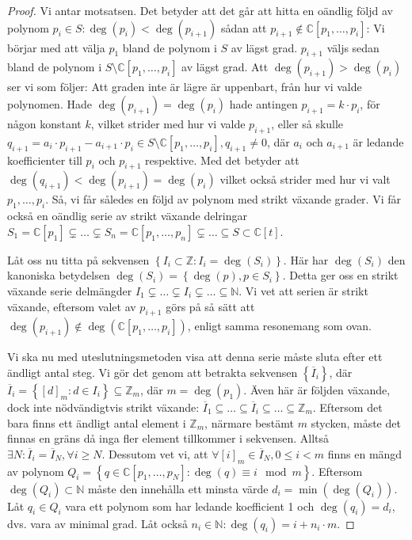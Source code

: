 \begin{proof}
Vi antar motsatsen. Det betyder att det går att hitta en oändlig följd av polynom $p_i\in S:\deg(p_i)<\deg(p_{i+1})$ sådan att $p_{i+1} \notin \mathbb{C}[p_1,\ldots,p_i]$: Vi börjar med att välja $p_1$ bland de polynom i $S$ av lägst grad. $p_{i+1}$ väljs sedan bland de polynom i $S \setminus \mathbb{C}[p_1,\ldots,p_i]$ av lägst grad. Att $\deg(p_{i+1})>\deg(p_i)$ ser vi som följer: Att graden inte är lägre är uppenbart, från hur vi valde polynomen. Hade $\deg(p_{i+1})=\deg(p_i)$ hade antingen $p_{i+1}=k\cdot p_i$, för någon konstant $k$, vilket strider med hur vi valde $p_{i+1}$, eller så skulle $q_{i+1}=a_i\cdot p_{i+1}-a_{i+1}\cdot p_i \in S\setminus\mathbb{C}[p_1,\ldots,p_i], q_{i+1} \neq 0$, där $a_i$ och $a_{i+1}$ är ledande koefficienter till $p_i$ och $p_{i+1}$ respektive. Med det betyder att $\deg(q_{i+1})<\deg(p_{i+1})=\deg(p_i)$ vilket också strider med hur vi valt $p_1,\ldots,p_i$. Så, vi får således en följd av polynom med strikt växande grader. Vi får också en oändlig serie av strikt växande delringar $S_1=\mathbb{C}[p_1] \subsetneq \ldots \subsetneq S_n=\mathbb{C}[p_1,\ldots,p_n] \subsetneq \ldots \subseteq S \subset \mathbb{C}[t]$.

Låt oss nu titta på sekvensen $\left\{I_i \subset \mathbb{Z}: I_i=\deg(S_i)\right\}$. Här har $\deg(S_i)$ den kanoniska betydelsen $\deg(S_i)=\left\{\deg(p), p \in S_i\right\}$. Detta ger oss en strikt växande serie delmängder $I_1 \subsetneq \ldots \subsetneq I_i \subsetneq \ldots \subseteq \mathbb{N}$. Vi vet att serien är strikt växande, eftersom valet av $p_{i+1}$ görs på så sätt att $\deg(p_{i+1})\notin \deg(\mathbb{C}[p_1,\ldots,p_i])$, enligt samma resonemang som ovan.

Vi ska nu med uteslutningsmetoden visa att denna serie måste sluta efter ett ändligt antal steg. Vi gör det genom att betrakta sekvensen $\left\{\overline{I}_i\right\}$, där $\overline{I}_i=\left\{[d]_m:d\in I_i \right\} \subseteq \mathbb{Z}_m$, där $m=\deg(p_1)$. Även här är följden växande, dock inte nödvändigtvis strikt växande: $\overline{I}_1 \subseteq \ldots \subseteq \overline{I}_i \subseteq \ldots \subseteq \mathbb{Z}_m$. Eftersom det bara finns ett ändligt antal element i $\mathbb{Z}_m$, närmare bestämt $m$ stycken, måste det finnas en gräns då inga fler element tillkommer i sekvensen. Alltså $\exists N : \overline{I}_i = \overline{I}_N, \forall i \geq N$. Dessutom vet vi, att $\forall [i]_m \in \overline{I}_N, 0 \leq i < m$ finns en mängd av polynom $Q_i=\left\{q \in \mathbb{C}[p_1,\ldots,p_N] : \deg(q) \equiv i \mod{m}\right\}$. Eftersom $\deg(Q_i) \subset \mathbb{N}$ måste den innehålla ett minsta värde $d_i=\min(\deg(Q_i))$. Låt $q_i \in Q_i$ vara ett polynom som har ledande koefficient 1 och $\deg(q_i)=d_i$, dvs. vara av minimal grad. Låt också $n_i \in \mathbb{N} : \deg(q_i) = i + n_i \cdot m$.


\end{proof}
